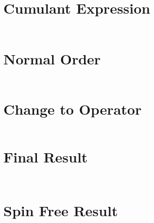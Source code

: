 \documentclass[11pt, oneside]{article}
\begin{document}
\section{Cumulant Expression}
\begin{multline}
    
\end{multline}
\section{Normal Order}
\begin{multline}
    
\end{multline}
\begin{equation}
    
\end{equation}
\begin{equation}
    
\end{equation}
\section{Change to Operator}
\begin{equation}
    
\end{equation}
\begin{equation}
    
\end{equation}
\section{Final Result}
\begin{multline}
 
\end{multline}
\begin{multline}
    
\end{multline}
\section{Spin Free Result}
\begin{multline}
    
\end{multline}
\end{document}
